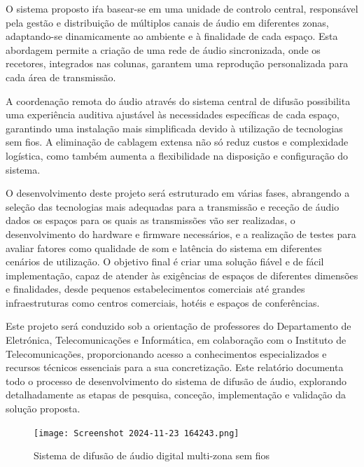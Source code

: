 \documentclass{article}
\begin{document}
O sistema proposto iŕa basear-se em uma unidade de controlo central, responsável pela gestão e distribuição de múltiplos canais de áudio em diferentes zonas, adaptando-se dinamicamente ao ambiente e à finalidade de cada espaço. Esta abordagem permite a criação de uma rede de áudio sincronizada, onde os recetores, integrados nas colunas, garantem uma reprodução personalizada para cada área de transmissão.


A coordenação remota do áudio através do sistema central de difusão possibilita uma experiência auditiva ajustável às necessidades específicas de cada espaço, garantindo uma instalação mais simplificada devido à utilização de tecnologias sem fios. A eliminação de cablagem extensa não só reduz custos e complexidade logística, como também aumenta a flexibilidade na disposição e configuração do sistema.


O desenvolvimento deste projeto será estruturado em várias fases, abrangendo a seleção das tecnologias mais adequadas para a transmissão e receção de áudio dados os espaços para os quais as transmissões vão ser realizadas, o desenvolvimento do hardware e firmware necessários, e a realização de testes para avaliar fatores como qualidade de som e latência do sistema em diferentes cenários de utilização. O objetivo final é criar uma solução fiável e de fácil implementação, capaz de atender às exigências de espaços de diferentes dimensões e finalidades, desde pequenos estabelecimentos comerciais até grandes infraestruturas como centros comerciais, hotéis e espaços de conferências.


Este projeto será conduzido sob a orientação de professores do Departamento de Eletrónica, Telecomunicações e Informática, em colaboração com o Instituto de Telecomunicações, proporcionando acesso a conhecimentos especializados e recursos técnicos essenciais para a sua concretização. Este relatório documenta todo o processo de desenvolvimento do sistema de difusão de áudio, explorando detalhadamente as etapas de pesquisa, conceção, implementação e validação da solução proposta.




\vspace{1cm}

\begin{figure}[h!] %
    \centering %
    \texttt{[image: Screenshot 2024-11-23 164243.png]} 
    \caption{Sistema de difusão de áudio digital multi-zona sem fios} %
    \label{fig:arquitetura} %
\end{figure}
\end{document}
